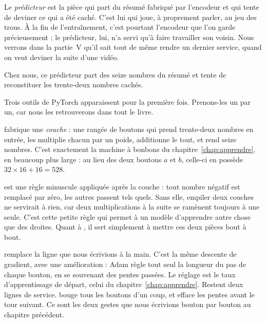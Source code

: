 \begin{definition}[Le prédicteur][predicteur]
Le \emph{prédicteur} est la pièce qui part du résumé fabriqué par l'encodeur
et qui tente de deviner ce qui a été caché. C'est lui qui joue, à proprement
parler, au jeu des trous. À la fin de l'entraînement, c'est pourtant
l'encodeur que l'on garde précieusement ; le prédicteur, lui, n'a servi qu'à
faire travailler son voisin. Nous verrons dans la partie~V qu'il sait tout de
même rendre un dernier service, quand on veut deviner la suite d'une vidéo.
\end{definition}

Chez nous, ce prédicteur part des seize nombres du résumé et tente de
reconstituer les trente-deux nombres cachés.

Trois outils de PyTorch apparaissent pour la première fois. Prenons-les un par
un, car nous les retrouverons dans tout le livre.

\begin{enclair}
 fabrique une \emph{couche} : une rangée
de boutons qui prend trente-deux nombres en entrée, les multiplie chacun par
un poids, additionne le tout, et rend seize nombres. C'est exactement la
machine à bonbons du chapitre~\ref{chap:apprendre}, en beaucoup plus large :
au lieu des deux boutons $a$ et $b$, celle-ci en possède
$32 \times 16 + 16 = 528$.

 est une règle minuscule appliquée après la
couche : tout nombre négatif est remplacé par zéro, les autres passent tels
quels. Sans elle, empiler deux couches ne servirait à rien, car deux
multiplications à la suite se ramènent toujours à une seule. C'est cette
petite règle qui permet à un modèle d'apprendre autre chose que des droites.
Quant à \mbox{}, il sert simplement à mettre ces deux
pièces bout à bout.

 remplace la ligne
 que nous écrivions à la main. C'est la même
descente de gradient, avec une amélioration : Adam règle tout seul la
longueur du pas de chaque bouton, en se souvenant des pentes passées. Le
réglage  est le taux d'apprentissage de départ, celui du
chapitre~\ref{chap:apprendre}. Restent deux lignes de service.
 bouge tous les boutons d'un coup, et
 efface les pentes avant le tour suivant. Ce
sont les deux gestes que nous écrivions bouton par bouton au chapitre
précédent.
\end{enclair}


